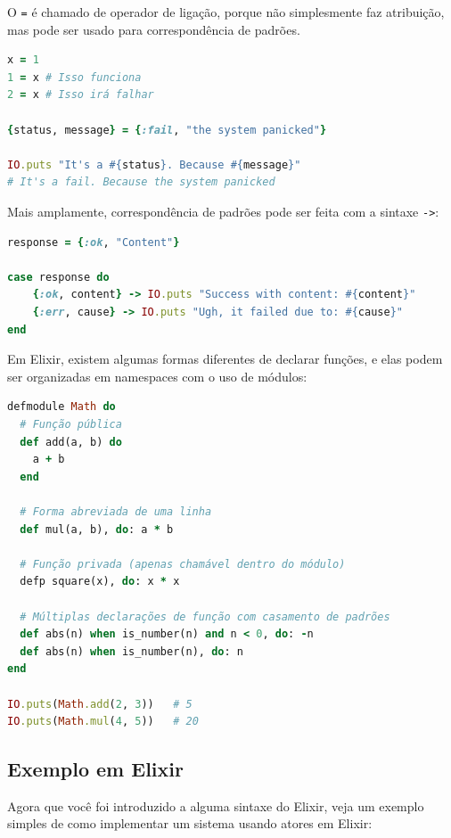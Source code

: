 O \texttt{=} é chamado de operador de ligação, porque não simplesmente faz atribuição, mas pode ser usado para correspondência de padrões.

\begin{lstlisting}[language=ruby, caption=Correspondência de Padrões em Elixir]
x = 1
1 = x # Isso funciona
2 = x # Isso irá falhar

{status, message} = {:fail, "the system panicked"}

IO.puts "It's a #{status}. Because #{message}"
# It's a fail. Because the system panicked
\end{lstlisting}

Mais amplamente, correspondência de padrões pode ser feita com a sintaxe \texttt{->}:

\begin{lstlisting}[language=ruby, caption=Estruturas de Controle em Elixir]
response = {:ok, "Content"}

case response do
	{:ok, content} -> IO.puts "Success with content: #{content}"
	{:err, cause} -> IO.puts "Ugh, it failed due to: #{cause}"
end
\end{lstlisting}

Em Elixir, existem algumas formas diferentes de declarar funções, e elas podem ser organizadas em namespaces com o uso de módulos:

\begin{lstlisting}[language=ruby, caption=Módulos e Funções em Elixir]
defmodule Math do
  # Função pública
  def add(a, b) do
    a + b
  end

  # Forma abreviada de uma linha
  def mul(a, b), do: a * b

  # Função privada (apenas chamável dentro do módulo)
  defp square(x), do: x * x

  # Múltiplas declarações de função com casamento de padrões
  def abs(n) when is_number(n) and n < 0, do: -n
  def abs(n) when is_number(n), do: n
end

IO.puts(Math.add(2, 3))   # 5
IO.puts(Math.mul(4, 5))   # 20
\end{lstlisting}

\subsection{Exemplo em Elixir}

Agora que você foi introduzido a alguma sintaxe do Elixir, veja um exemplo simples de como implementar um sistema usando atores em Elixir:

